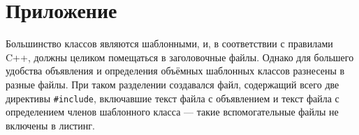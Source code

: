\documentclass[14pt]{extarticle}
\begin{document}
\appendix
\section*{Приложение}
Большинство классов являются шаблонными, и, в соответствии с правилами C++,
должны целиком помещаться в заголовочные файлы. Однако для большего удобства
объявления и определения объёмных шаблонных классов разнесены в разные файлы.
При таком разделении создавался файл, содержащий всего две директивы
\texttt{\#include}, включавшие текст файла с объявлением и текст файла с
определением членов шаблонного класса — такие вспомогательные файлы не включены 
в листинг.


\end{document}

